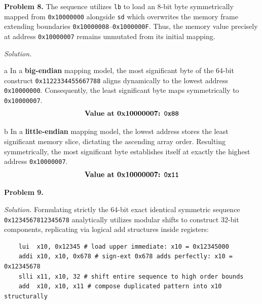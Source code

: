 \documentclass[11pt]{article}
\newcommand{\problem}[1]{\vspace{0.5em}\noindent\textbf{Problem #1.}\vspace{0.3em}}
\newenvironment{solution}{\par\noindent\textit{Solution.}}{\par\vspace{1em}}
\begin{document}
\problem{8}
The sequence utilizes \texttt{lb} to load an 8-bit byte symmetrically mapped from \texttt{0x10000000} alongside \texttt{sd} which overwrites the memory frame extending boundaries \texttt{0x10000008}--\texttt{0x1000000F}. Thus, the memory value precisely at address \texttt{0x10000007} remains unmutated from its initial mapping. 
\begin{solution}
    \begin{subproblem}{a}
        In a \textbf{big-endian} mapping model, the most significant byte of the 64-bit construct \texttt{0x1122334455667788} aligns dynamically to the lowest address \texttt{0x10000000}. Consequently, the least significant byte maps symmetrically to \texttt{0x10000007}.
        \[ \textbf{Value at 0x10000007: \texttt{0x88}} \]
    \end{subproblem}

    \begin{subproblem}{b}
        In a \textbf{little-endian} mapping model, the lowest address stores the least significant memory slice, dictating the ascending array order. Resulting symmetrically, the most significant byte establishes itself at exactly the highest address \texttt{0x10000007}.
        \[ \textbf{Value at 0x10000007: \texttt{0x11}} \]
    \end{subproblem}
\end{solution}

\problem{9}
\begin{solution}
    Formulating strictly the 64-bit exact identical symmetric sequence \texttt{0x1234567812345678} analytically utilizes modular shifts to construct 32-bit components, replicating via logical add structures inside registers:
    \begin{verbatim}
    lui  x10, 0x12345 # load upper immediate: x10 = 0x12345000
    addi x10, x10, 0x678 # sign-ext 0x678 adds perfectly: x10 = 0x12345678
    slli x11, x10, 32 # shift entire sequence to high order bounds
    add  x10, x10, x11 # compose duplicated pattern into x10 structurally
    \end{verbatim}
\end{solution}
\end{document}
